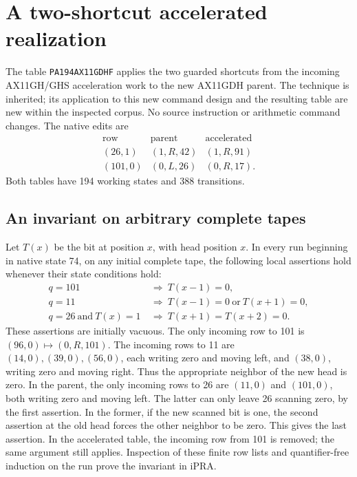 \section{A two-shortcut accelerated realization}
\label{sec:acceleration}

The table \texttt{PA194AX11GDHF} applies the two guarded shortcuts from
the incoming AX11GH/GHS acceleration work to the new AX11GDH parent.
The technique is inherited; its application to this new command design
and the resulting table are new within the inspected corpus.
No source instruction or arithmetic command changes. The native edits are
\[
\begin{array}{c|c|c}
\text{row}&\text{parent}&\text{accelerated}\\\hline
(26,1)&(1,R,42)&(1,R,91)\\
(101,0)&(0,L,26)&(0,R,17).
\end{array}
\]
Both tables have 194 working states and 388 transitions.

\subsection{An invariant on arbitrary complete tapes}

Let $T(x)$ be the bit at position $x$, with head position $x$.
In every run beginning in native state 74, on any initial complete tape,
the following local assertions hold whenever their state conditions hold:
\begin{align*}
q=101&\ \Longrightarrow\ T(x-1)=0,\\
q=11&\ \Longrightarrow\ T(x-1)=0\ \text{or}\ T(x+1)=0,\\
q=26\ \text{and}\ T(x)=1
 &\ \Longrightarrow\ T(x+1)=T(x+2)=0.
\end{align*}
These assertions are initially vacuous. The only incoming row to 101 is
$(96,0)\mapsto(0,R,101)$. The incoming rows to 11 are
$(14,0),(39,0),(56,0)$, each writing zero and moving left, and
$(38,0)$, writing zero and moving right. Thus the appropriate neighbor
of the new head is zero. In the parent, the only incoming rows to 26 are
$(11,0)$ and $(101,0)$, both writing zero and moving left.
The latter can only leave 26 scanning zero, by the first assertion.
In the former, if the new scanned bit is one, the second assertion at
the old head forces the other neighbor to be zero. This gives the last
assertion. In the accelerated table, the incoming row from 101 is removed;
the same argument still applies. Inspection of these finite row lists
and quantifier-free induction on the run prove the invariant in iPRA.

